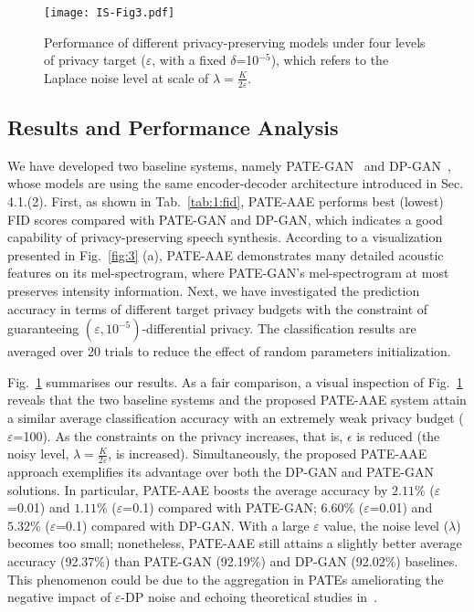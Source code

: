\documentclass[a4paper]{article}
\begin{document}
\begin{figure}[ht!]
    \centering
    \texttt{[image: IS-Fig3.pdf]}
    \caption{Performance of different privacy-preserving models under four levels of privacy target ($\varepsilon$, with a fixed $\delta$=10$^{-5}$), which refers to the Laplace noise level at scale of $\lambda=\frac{K}{2\varepsilon}$. }
    \label{fig:4}
\end{figure}

\subsection{Results and Performance Analysis}
We have developed two baseline systems, namely  PATE-GAN~\cite{jordon2019pate} and DP-GAN~\cite{xie2018differentially}, whose models are using the same encoder-decoder architecture introduced in Sec. 4.1.(2). First, as shown in Tab.~\ref{tab:1:fid}, PATE-AAE performs best (lowest) FID scores compared with PATE-GAN and DP-GAN, which indicates a good capability of privacy-preserving speech synthesis. According to a visualization presented in Fig.~\ref{fig:3} (a), PATE-AAE demonstrates many detailed acoustic features on its mel-spectrogram, where PATE-GAN's mel-spectrogram at most preserves intensity information. Next, we have investigated the prediction accuracy in terms of different target privacy budgets with the constraint of guaranteeing $(\varepsilon,10^{-5})$-differential privacy. The classification results are averaged over 20 trials to reduce the effect of random parameters initialization.

Fig.~\ref{fig:4} summarises our results. As a fair comparison, a visual inspection of Fig.~\ref{fig:4} reveals that the two baseline systems and the proposed PATE-AAE system attain a similar average classification accuracy with an extremely weak privacy budget ($\varepsilon$=100).
As the constraints on the privacy increases, that is, $\epsilon$ is reduced (the noisy level, $\lambda=\frac{K}{2\varepsilon}$, is increased). Simultaneously, the proposed PATE-AAE approach exemplifies its advantage over both the DP-GAN and PATE-GAN solutions. In particular, PATE-AAE boosts the average accuracy by $2.11\%$ ($\varepsilon$=0.01) and $1.11\%$ ($\varepsilon$=0.1) compared with PATE-GAN; $6.60\%$ ($\varepsilon$=0.01) and $5.32\%$ ($\varepsilon$=0.1) compared with DP-GAN. With a large $\varepsilon$ value, the noise level ($\lambda$) becomes too small; nonetheless, PATE-AAE still attains a slightly better average accuracy (92.37\%) than PATE-GAN (92.19\%) and DP-GAN (92.02\%) baselines. This phenomenon could be due to the aggregation in PATEs ameliorating the negative impact of $\varepsilon$-DP noise and echoing theoretical studies in~\cite{papernot2018scalable, jordon2019pate, chen2020gs}.
\end{document}
